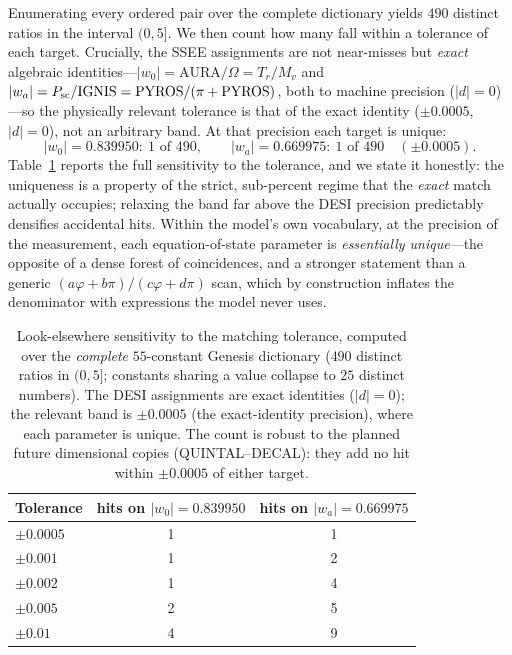 \documentclass[a4paper,11pt]{article}
\begin{document}
Enumerating every ordered pair over the complete dictionary yields $490$ distinct
ratios in the interval $(0,5]$. We then count how many fall within a tolerance of
each target. Crucially, the SSEE assignments are not near-misses but \emph{exact}
algebraic identities---$|w_0|=\mathrm{AURA}/\Omega=T_r/M_v$ and
$|w_a|=P_{\rm sc}/\mathrm{IGNIS}=\mathrm{PYROS}/(\pi+\mathrm{PYROS})$, both to machine precision
($|d|=0$)---so the physically relevant tolerance is that of the exact identity
($\pm0.0005$, $|d|=0$), not an arbitrary band. At that precision each target is
unique:
\begin{equation}
  |w_0|=0.839950:\ \text{1 of 490},\qquad
  |w_a|=0.669975:\ \text{1 of 490}\quad(\pm0.0005).
  \label{eq:lookelsewhere}
\end{equation}
Table~\ref{tab:lookelsewhere-tol} reports the full sensitivity to the tolerance,
and we state it honestly: the uniqueness is a property of the strict, sub-percent
regime that the \emph{exact} match actually occupies; relaxing the band far above
the DESI precision predictably densifies accidental hits. Within the model's own
vocabulary, at the precision of the measurement, each equation-of-state parameter
is \emph{essentially unique}---the opposite of a dense forest of coincidences, and
a stronger statement than a generic $(a\varphi+b\pi)/(c\varphi+d\pi)$ scan, which
by construction inflates the denominator with expressions the model never uses.

\begin{table}[ht]
\centering
\caption{Look-elsewhere sensitivity to the matching tolerance, computed over the
\emph{complete} $55$-constant Genesis dictionary ($490$ distinct ratios in
$(0,5]$; constants sharing a value collapse to $25$ distinct
numbers). The DESI assignments are exact identities ($|d|=0$); the relevant band is
$\pm0.0005$ (the exact-identity precision), where each parameter is unique. The count is
robust to the planned future dimensional copies (QUINTAL--DECAL): they add no hit
within $\pm0.0005$ of either target.}
\label{tab:lookelsewhere-tol}
\begin{tabular}{lcc}
\toprule
Tolerance & hits on $|w_0|=0.839950$ & hits on $|w_a|=0.669975$ \\
\midrule
$\pm0.0005$ & 1 & 1 \\
$\pm0.001$  & 1 & 2 \\
$\pm0.002$  & 1 & 4 \\
$\pm0.005$  & 2 & 5 \\
$\pm0.01$   & 4 & 9 \\
\bottomrule
\end{tabular}
\end{table}
\end{document}
